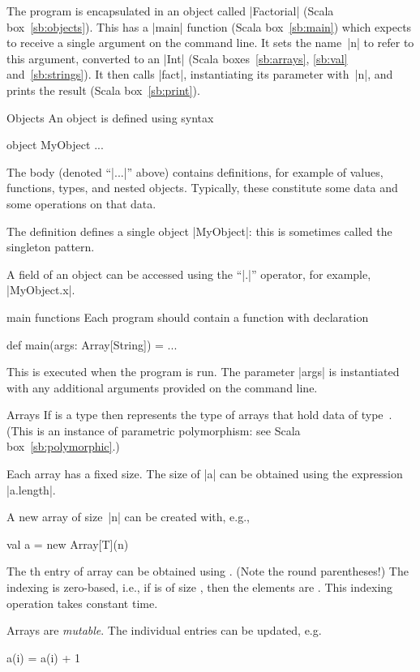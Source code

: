 \pagebreak[3]

The program is encapsulated in an object called |Factorial| (Scala
box~\ref{sb:objects}).  This has a |main| function (Scala box~\ref{sb:main})
which expects to receive a single argument on the command line.  It sets the
name~|n| to refer to this argument, converted to an |Int| (Scala
boxes~\ref{sb:arrays}, \ref{sb:val} and~\ref{sb:strings}).  It then calls
|fact|, instantiating its parameter with~|n|, and prints the result (Scala
box~\ref{sb:print}).


\begin{scalaBox}{Objects}
\label{sb:objects}
An object is defined using syntax
\begin{scala}
  object MyObject{ ... }
\end{scala}
%
The body (denoted ``|...|'' above) contains definitions, for example of
values, functions, types, and nested objects.  Typically, these constitute
some data and some operations on that data.

The definition defines a single object |MyObject|: this is sometimes called
the singleton pattern.

A field of an object can be accessed using the ``|.|'' operator,
for example, |MyObject.x|. 
\end{scalaBox}


\begin{scalaBox}{{\scalashape main} functions}
\label{sb:main}
Each program should contain a function with declaration
\begin{scala}
  def main(args: Array[String]) = ...
\end{scala}
This is  executed when the program is run.  The parameter |args| is
instantiated with any additional arguments provided on the command line.
\end{scalaBox}


\begin{scalaBox}{Arrays}
\label{sb:arrays}
If  is a type then  represents the type of arrays
that hold data of type~.  (This is an instance of parametric
polymorphism: see Scala box~\ref{sb:polymorphic}.)

Each array has a fixed size. The size of |a| can be obtained using the
expression |a.length|.

A new array of size~|n| can be created with, e.g.,
\begin{scala}
  val a = new Array[T](n)
\end{scala}

The th entry of array  can be obtained using .
(Note the round parentheses!)  The indexing is zero-based, i.e., if 
is of size , then the elements are .  This
indexing operation takes constant time.  

Arrays are \emph{mutable}.  The individual entries can be updated, e.g.
\begin{scala}
  a(i) = a(i) + 1
\end{scala}
\end{scalaBox}

